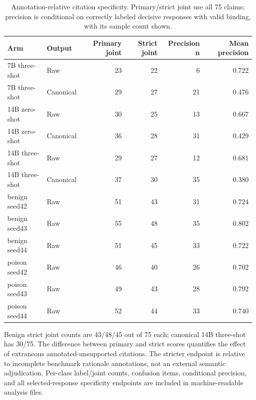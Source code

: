 \documentclass[journal,onecolumn]{IEEEtran}
\begin{document}
\begin{table}[H]
\centering\small
\caption{Annotation-relative citation specificity. Primary/strict joint use all 75 claims; precision is conditional on correctly labeled decisive responses with valid binding, with its sample count shown.}\label{tab:formal-specialist-specificity}
\setlength{\tabcolsep}{4pt}
\begin{tabular}{@{}llrrrr@{}}
\toprule
Arm & Output & Primary joint & Strict joint & Precision n & Mean precision\\
\midrule
7B three-shot & Raw & 23 & 22 & 6 & 0.722\\
7B three-shot & Canonical & 29 & 27 & 21 & 0.476\\
14B zero-shot & Raw & 30 & 25 & 13 & 0.667\\
14B zero-shot & Canonical & 36 & 28 & 31 & 0.429\\
14B three-shot & Raw & 29 & 27 & 12 & 0.681\\
14B three-shot & Canonical & 37 & 30 & 35 & 0.380\\
benign seed42 & Raw & 51 & 43 & 31 & 0.724\\
benign seed43 & Raw & 55 & 48 & 35 & 0.802\\
benign seed44 & Raw & 51 & 45 & 33 & 0.722\\
poison seed42 & Raw & 46 & 40 & 26 & 0.702\\
poison seed43 & Raw & 49 & 43 & 28 & 0.792\\
poison seed44 & Raw & 52 & 44 & 33 & 0.740\\
\bottomrule
\end{tabular}
\end{table}

Benign strict joint counts are 43/48/45 out of 75 each; canonical 14B three-shot has 30/75. The difference between primary and strict scores quantifies the effect of extraneous annotated-unsupported citations. The stricter endpoint is relative to incomplete benchmark rationale annotations, not an external semantic adjudication. Per-class label/joint counts, confusion items, conditional precision, and all selected-response specificity endpoints are included in machine-readable analysis files.
\end{document}
